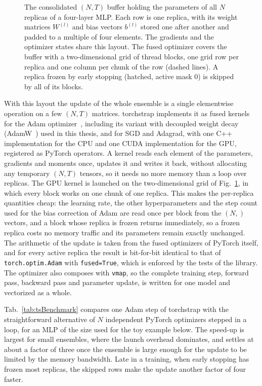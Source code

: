 \begin{figure}[htbp]
\begin{tikzpicture}[font=\small, x=0.86cm, y=1cm]
	\end{tikzpicture}
	\caption[Consolidated parameter buffer of an ensemble and the launch grid of the fused optimizer]{The consolidated \((N, T)\) buffer holding the parameters of all \(N\) replicas of a four-layer MLP. Each row is one replica, with its weight matrices \(W^{(l)}\) and bias vectors \(b^{(l)}\) stored one after another and padded to a multiple of four elements. The gradients and the optimizer states share this layout. The fused optimizer covers the buffer with a two-dimensional grid of thread blocks, one grid row per replica and one column per chunk of the row (dashed lines). A replica frozen by early stopping (hatched, active mask 0) is skipped by all of its blocks.}
	\label{fig:tsConsolidated}
\end{figure}

With this layout the update of the whole ensemble is a single elementwise operation on a few \((N, T)\) matrices.
%
torchstrap implements it as fused kernels for the Adam optimizer~\cite{Kingma:2014adam}, including its variant with decoupled weight decay (AdamW~\cite{Loshchilov:2017adamw}) used in this thesis, and for SGD and Adagrad, with one C++ implementation for the CPU and one CUDA implementation for the GPU, registered as PyTorch operators.
%
A kernel reads each element of the parameters, gradients and moments once, updates it and writes it back, without allocating any temporary \((N, T)\) tensors, so it needs no more memory than a loop over replicas.
%
The GPU kernel is launched on the two-dimensional grid of Fig.~\ref{fig:tsConsolidated}, in which every block works on one chunk of one replica.
%
This makes the per-replica quantities cheap: the learning rate, the other hyperparameters and the step count used for the bias correction of Adam are read once per block from the \((N,)\) vectors, and a block whose replica is frozen returns immediately, so a frozen replica costs no memory traffic and its parameters remain exactly unchanged.
%
The arithmetic of the update is taken from the fused optimizers of PyTorch itself, and for every active replica the result is bit-for-bit identical to that of \texttt{torch.optim.Adam} with \texttt{fused=True}, which is enforced by the tests of the library.
%
The optimizer also composes with \texttt{vmap}, so the complete training step, forward pass, backward pass and parameter update, is written for one model and vectorized as a whole.

Tab.~\ref{tab:tsBenchmark} compares one Adam step of torchstrap with the straightforward alternative of \(N\) independent PyTorch optimizers stepped in a loop, for an MLP of the size used for the toy example below.
%
The speed-up is largest for small ensembles, where the launch overhead dominates, and settles at about a factor of three once the ensemble is large enough for the update to be limited by the memory bandwidth.
%
Late in a training, when early stopping has frozen most replicas, the skipped rows make the update another factor of four faster.

